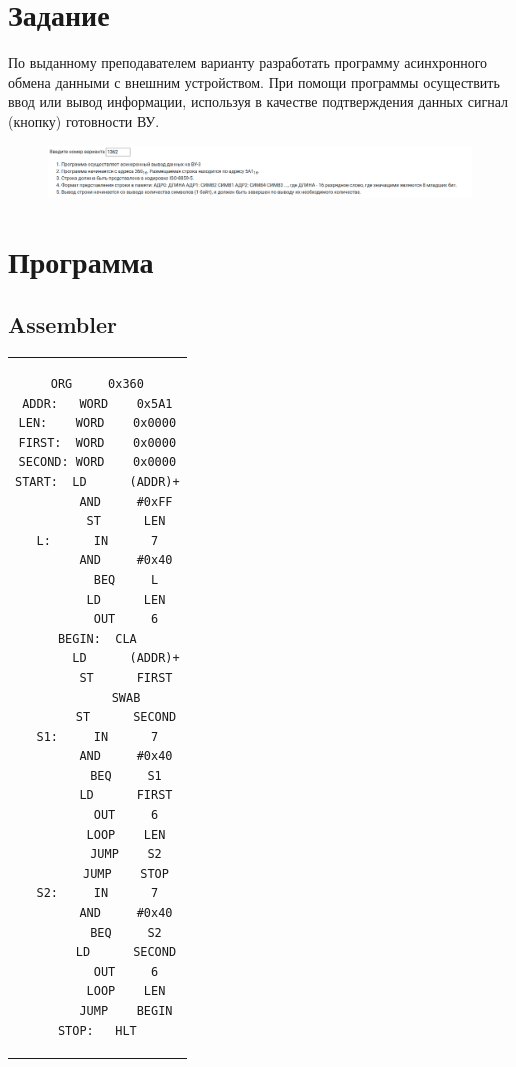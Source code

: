 

\section{Задание}
По выданному преподавателем варианту разработать программу асинхронного обмена данными с внешним устройством. При помощи
программы осуществить ввод или вывод информации, используя в качестве подтверждения данных сигнал (кнопку) готовности ВУ.


\begin{figure}[H]
    \centering
    \includegraphics[scale=0.35]{img/variant}
\end{figure}


\section{Программа}

\subsection{Assembler}

\begin{center}
    \begin{tabular}{c}
        \begin{lstlisting}[basicstyle=\ttfamily]
        ORG     0x360
ADDR:	WORD	0x5A1
LEN:	WORD	0x0000
FIRST:	WORD	0x0000
SECOND: WORD    0x0000
START:  LD      (ADDR)+
        AND     #0xFF
        ST      LEN
L:      IN      7
        AND     #0x40
        BEQ     L
        LD      LEN
        OUT     6
BEGIN:	CLA
        LD      (ADDR)+
        ST      FIRST
        SWAB
        ST      SECOND
S1:     IN      7
        AND     #0x40
        BEQ     S1
        LD      FIRST
        OUT     6
        LOOP    LEN
        JUMP    S2
        JUMP    STOP
S2:     IN      7
        AND     #0x40
        BEQ     S2
        LD      SECOND
        OUT     6
        LOOP    LEN
        JUMP    BEGIN
STOP:	HLT

        \end{lstlisting}
    \end{tabular}
\end{center}

\newpage


